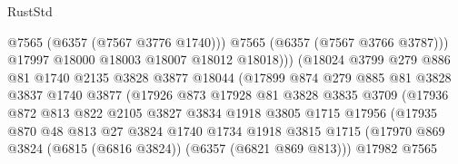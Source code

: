 \begin{lexlean}{RustStd}
\begin{coremodule}
                                    @7565
                                    (@6357 (@7567 @3776 @1740)))
                                  @7565
                                  (@6357 (@7567 @3766 @3787)))
                                @17997
                                @18000
                                @18003
                                @18007
                                @18012
                                @18018)))
                          (@18024
                            @3799
                            @279
                            @886
                            @81
                            @1740
                            @2135
                            @3828
                            @3877
                            @18044
                            (@17899
                              @874
                              @279
                              @885
                              @81
                              @3828
                              @3837
                              @1740
                              @3877
                              (@17926
                                @873
                                @17928
                                @81
                                @3828
                                @3835
                                @3709
                                (@17936
                                  @872
                                  @813
                                  @822
                                  @2105
                                  @3827
                                  @3834
                                  @1918
                                  @3805
                                  @1715
                                  @17956
                                  (@17935
                                    @870
                                    @48
                                    @813
                                    @27
                                    @3824
                                    @1740
                                    @1734
                                    @1918
                                    @3815
                                    @1715
                                    (@17970
                                      @869
                                      @3824
                                      (@6815 (@6816 @3824))
                                      (@6357 (@6821 @869 @813)))
                                    @17982
                                    @7565

\end{coremodule}
\end{lexlean}
